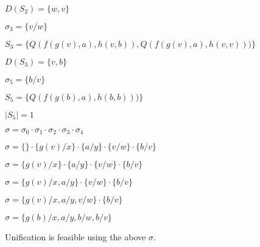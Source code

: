 \documentclass{article}
\begin{document}
\begin{enumerate}
\begin{enumerate}
\begin{answer}
    	$D(S_2) = \{ w, v\}$
    	\bigskip
    	
    	$\sigma_3 = \{ v/w \}$
    	
    	$S_3 = \{ Q(f(g(v),a),h(v,b)), Q(f(g(v),a),h(v,v))) \}$
    	
    	$D(S_3) = \{ v, b\}$
    	\bigskip
    	
    	$\sigma_5 = \{ b/v \}$
    	
    	$S_5 = \{ Q(f(g(b),a),h(b,b))) \}$
    	
    	$|S_5| = 1$
    	\bigskip
    	
    	$\sigma = \sigma_0 \cdot{} \sigma_1 \cdot{} \sigma_2 \cdot{} \sigma_3
    	\cdot{} \sigma_4$
		
		$\sigma = \{\} \cdot{} \{g(v)/x\} \cdot{} \{ a/y \} \cdot{} \{v/w \} \cdot{}
		\{ b/v \}$
		
		$\sigma = \{g(v)/x\} \cdot{} \{ a/y \} \cdot{} \{v/w \} \cdot{} \{ b/v \}$
		
		$\sigma = \{g(v)/x, a/y \} \cdot{} \{v/w \} \cdot{} \{ b/v \}$
		
		$\sigma = \{g(v)/x, a/y, v/w \} \cdot{} \{ b/v \}$
		
		$\sigma = \{g(b)/x, a/y, b/w, b/v \}$
		\bigskip
		
		Unification is feasible using the above $\sigma$.	    	
    \end{answer}
  \end{enumerate}

\end{enumerate}
\end{document}

